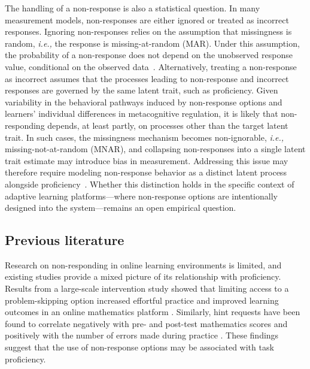 \documentclass[11pt]{article}
\begin{document}
The handling of a non-response is also a statistical question. In many measurement models, non-responses are either ignored or treated as incorrect responses. Ignoring non-responses relies on the assumption that missingness is random, \textit{i.e.,} the response is missing-at-random (MAR). Under this assumption, the probability of a non-response does not depend on the unobserved response value, conditional on the observed data~\parencite{rubin1976inference}. Alternatively, treating a non-response as incorrect assumes that the processes leading to non-response and incorrect responses are governed by the same latent trait, such as proficiency. Given variability in the behavioral pathways induced by non-response options and learners’ individual differences in metacognitive regulation, it is likely that non-responding depends, at least partly, on processes other than the target latent trait. In such cases, the missingness mechanism becomes non-ignorable, \textit{i.e.,} missing-not-at-random (MNAR), and collapsing non-responses into a single latent trait estimate may introduce bias in measurement. Addressing this issue may therefore require modeling non-response behavior as a distinct latent process alongside proficiency~\parencite{little2019statistical}. Whether this distinction holds in the specific context of adaptive learning platforms---where non-response options are intentionally designed into the system---remains an open empirical question.


\subsection{Previous literature}
Research on non-responding in online learning environments is limited, and existing studies provide a mixed picture of its relationship with proficiency. Results from a large-scale intervention study showed that limiting access to a problem-skipping option increased effortful practice and improved learning outcomes in an online mathematics platform \parencite{savi2018delaying, savi2023combating}. Similarly, hint requests have been found to correlate negatively with pre- and post-test mathematics scores and positively with the number of errors made during practice \parencite{norum2024student}. These findings suggest that the use of non-response options may be associated with task proficiency. 
\end{document}
